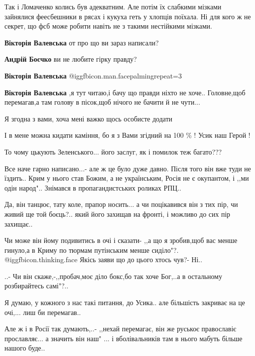 \begin{itemize}
Так і Ломаченко колись був адекватним. Але потім їх слабкими мізками зайнялися
феесбешники в рясах і кукуха геть у хлопців поїхала. Ні для кого ж не секрет,
що фсб може робити навіть не з такими нестійкими мізками.

\begin{itemize} %
\textbf{Вікторія Валевська} от про що ви зараз написали?

\textbf{Андрій Боєчко} ви не любите гірку правду?

\textbf{Вікторія Валевська}  @igg{fbicon.man.facepalming}{repeat=3} 

\textbf{Вікторія Валевська} ,я тут читаю,і бачу що правди ніхто не хоче.. Головне,щоб перемагав,а там голову в пісок,щоб нічого не бачити й не чути...
\end{itemize} %

Я згодна з вами, хоча мені важко щось особисте додати

І в мене можна кидати каміння, бо я з Вами згідний на 100 \% ! Усик наш Герой !

То чому цькують Зеленського... його заслуг, як і помилок теж багато???


Все наче гарно написано...- але ж це було дуже давно. Після того він вже туди
не їздить.. Крим у нього став Божим, а не українським, Росія не є окупантом, і
,,ми одін народ".. Знімався в пропагандистських роликах РПЦ..

Да, він танцює, тату коле, прапор носить... а чи поцікавився він з тих пір, чи живий
ще той боєць?.. який його захищав на фронті, і можливо до сих пір захищає..

Чи може він йому подивитись в очі і сказати- ,,а що я зробив,щоб вас менше
гинуло,а в Криму по тюрмам путінським менше сиділо"?. @igg{fbicon.thinking.face} Якісь заяви що до цього
хтось чув?- Ні..

..- Чи він скаже,-,,пробач,моє діло бокс,бо так хоче Бог,..а в остальному розбирайтесь самі"?..

Я думаю, у кожного з нас такі питання, до Усика.. але більшість закриває на це очі,... лиш би перемагав..

Але ж і в Росії так думають,..- ,,нехай перемагає, він же руськоє православіє
прославляє... а значить він наш" ... і вболівальників там в нього мабуть більше
нашого буде..


\end{itemize}
